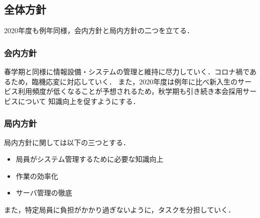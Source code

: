 \subsection*{全体方針}

2020年度も例年同様，会内方針と局内方針の二つを立てる．
\subsubsection*{会内方針}
\par 春学期と同様に情報設備・システムの管理と維持に尽力していく．コロナ禍であるため，臨機応変に対応していく．
また，2020年度は例年に比べ新入生のサービス利用頻度が低くなることが予想されるため，秋学期も引き続き本会採用サービスについて
知識向上を促すようにする．

\subsubsection*{局内方針}
局内方針に関しては以下の三つとする．
\begin{itemize}
    \item 局員がシステム管理するために必要な知識向上
    \item 作業の効率化
    \item サーバ管理の徹底
\end{itemize}
また，特定局員に負担がかかり過ぎないように，タスクを分担していく．

